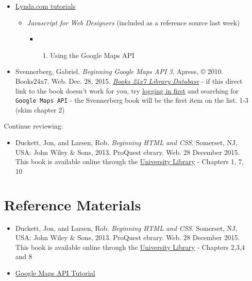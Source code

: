 \documentclass[]{book}
\providecommand{\tightlist}{%
  \setlength{\itemsep}{0pt}\setlength{\parskip}{0pt}}
\begin{document}
\begin{itemize}
\item
  \href{http://www.lynda.com/SharedPlaylist/2b710369c9ec4d8c964467225c6610ad?org=unm.edu}{Lynda.com
  tutorials}

  \begin{itemize}
  \tightlist
  \item
    \emph{Javascript for Web Designers} (included as a reference source
    last week)

    \begin{itemize}
    \item
      \begin{enumerate}
      \def\labelenumi{\arabic{enumi}.}
      \setcounter{enumi}{4}
      \tightlist
      \item
        Using the Google Maps API
      \end{enumerate}
    \end{itemize}
  \end{itemize}
\item
  Svennerberg, Gabriel. \emph{Beginning Google Maps API 3}. Apress, ©
  2010. Books24x7. Web. Dec. 28, 2015.
  \href{http://library.books24x7.com.libproxy.unm.edu/toc.aspx?bookid=36390\&refid=SVA3S}{\emph{Books
  24x7 Library Database}} - if this direct link to the book doesn't work
  for you, try
  \href{http://library.unm.edu/applications/dam/plink.php?db_id=238}{logging
  in first} and searching for \texttt{Google\ Maps\ API} - the
  Svennerberg book will be the first item on the list. 1-3 (skim chapter
  2)
\end{itemize}

Continue reviewing:

\begin{itemize}
\tightlist
\item
  Duckett, Jon, and Larsen, Rob. \emph{Beginning HTML and CSS}.
  Somerset, NJ, USA: John Wiley \& Sons, 2013. ProQuest ebrary. Web. 28
  December 2015. This book is available online through the
  \href{http://site.ebrary.com.libproxy.unm.edu/lib/unma/detail.action?docID=10667426}{University
  Library} - Chapters 1, 7, 10
\end{itemize}

\section{Reference Materials}\label{week03-reference}

\begin{itemize}
\item
  Duckett, Jon, and Larsen, Rob. \emph{Beginning HTML and CSS}.
  Somerset, NJ, USA: John Wiley \& Sons, 2013. ProQuest ebrary. Web. 28
  December 2015. This book is available online through the
  \href{http://site.ebrary.com.libproxy.unm.edu/lib/unma/detail.action?docID=10667426}{University
  Library} - Chapters 2,3,4 and 8
\item
  \href{http://code.google.com/apis/maps/documentation/javascript/tutorial.html}{Google
  Maps API Tutorial}
\end{itemize}
\end{document}

